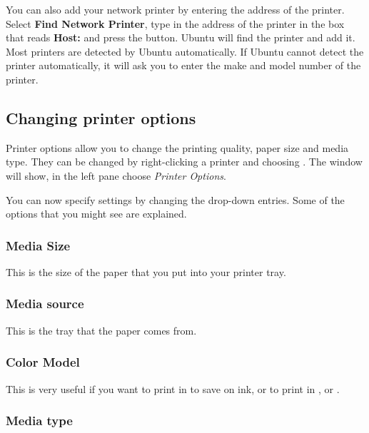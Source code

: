 You can also add your network printer by entering the  address of the printer. Select \textbf{Find Network Printer}, type in the  address of the printer in the box that reads \textbf{Host:} and press the  button. Ubuntu will find the printer and add it. Most printers are detected by Ubuntu automatically. If Ubuntu cannot detect the printer automatically, it will ask you to enter the make and model number of the printer.

\subsection{Changing printer options} 

Printer options allow you to change the printing quality, paper size and media type. They
can be changed by right-clicking a printer and choosing . The 
window will show, in the left pane choose \emph{Printer Options}.

You can now specify settings by changing the drop-down entries. Some
 of the options that you might see are explained.

\subsubsection{Media Size}

This is the size of the paper that you put into your printer tray.

\subsubsection{Media source} 

This is the tray that the paper comes from.

\subsubsection{Color Model}

This is very useful if you want to print in  to save on ink, or to print in , or .

\subsubsection{Media type}

